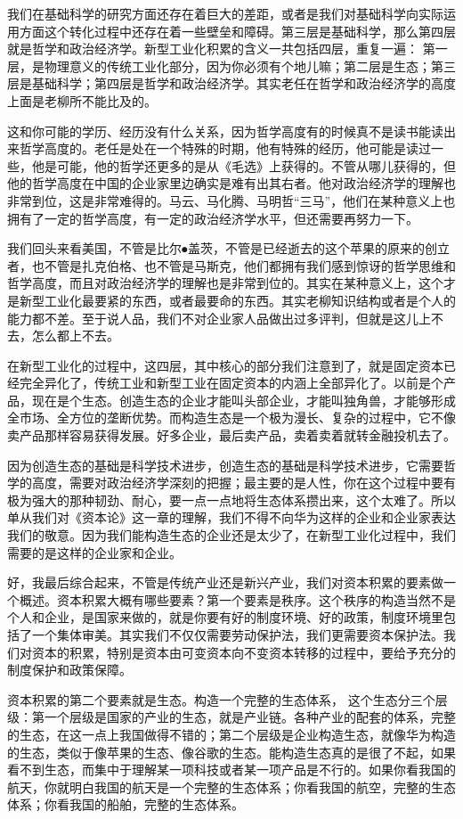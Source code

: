 \documentclass[UTF8, 12pt, a4paper]{ctexrep}
\begin{document}
我们在基础科学的研究方面还存在着巨大的差距，或者是我们对基础科学向实际运用方面这个转化过程中还存在着一些壁垒和障碍。第三层是基础科学，那么第四层就是哲学和政治经济学。新型工业化积累的含义一共包括四层，重复一遍： 第一层，是物理意义的传统工业化部分，因为你必须有个地儿嘛；第二层是生态；第三层是基础科学；第四层是哲学和政治经济学。其实老任在哲学和政治经济学的高度上面是老柳所不能比及的。

这和你可能的学历、经历没有什么关系，因为哲学高度有的时候真不是读书能读出来哲学高度的。老任是处在一个特殊的时期，他有特殊的经历，他可能是读过一些，他是可能，他的哲学还更多的是从《毛选》上获得的。不管从哪儿获得的，但他的哲学高度在中国的企业家里边确实是难有出其右者。他对政治经济学的理解也非常到位，这是非常难得的。马云、马化腾、马明哲“三马”，他们在某种意义上也拥有了一定的哲学高度，有一定的政治经济学水平，但还需要再努力一下。

我们回头来看美国，不管是比尔⦁盖茨，不管是已经逝去的这个苹果的原来的创立者，也不管是扎克伯格、也不管是马斯克，他们都拥有我们感到惊讶的哲学思维和哲学高度，而且对政治经济学的理解也是非常到位的。其实在某种意义上，这个才是新型工业化最要紧的东西，或者最要命的东西。其实老柳知识结构或者是个人的能力都不差。至于说人品，我们不对企业家人品做出过多评判，但就是这儿上不去，怎么都上不去。

在新型工业化的过程中，这四层，其中核心的部分我们注意到了，就是固定资本已经完全异化了，传统工业和新型工业在固定资本的内涵上全部异化了。以前是个产品，现在是个生态。创造生态的企业才能叫头部企业，才能叫独角兽，才能够形成全市场、全方位的垄断优势。而构造生态是一个极为漫长、复杂的过程中，它不像卖产品那样容易获得发展。好多企业，最后卖产品，卖着卖着就转金融投机去了。

因为创造生态的基础是科学技术进步，创造生态的基础是科学技术进步，它需要哲学的高度，需要对政治经济学深刻的把握；最主要的是人性，你在这个过程中要有极为强大的那种韧劲、耐心，要一点一点地将生态体系攒出来，这个太难了。所以单从我们对《资本论》这一章的理解，我们不得不向华为这样的企业和企业家表达我们的敬意。因为我们能构造生态的企业还是太少了，在新型工业化过程中，我们需要的是这样的企业家和企业。

好，我最后综合起来，不管是传统产业还是新兴产业，我们对资本积累的要素做一个概述。资本积累大概有哪些要素？第一个要素是秩序。这个秩序的构造当然不是个人和企业，是国家来做的，就是你要有好的制度环境、好的政策，制度环境里包括了一个集体审美。其实我们不仅仅需要劳动保护法，我们更需要资本保护法。我们对资本的积累，特别是资本由可变资本向不变资本转移的过程中，要给予充分的制度保护和政策保障。

资本积累的第二个要素就是生态。构造一个完整的生态体系， 这个生态分三个层级：第一个层级是国家的产业的生态，就是产业链。各种产业的配套的体系，完整的生态，在这一点上我国做得不错的；第二个层级是企业构造生态，就像华为构造的生态，类似于像苹果的生态、像谷歌的生态。能构造生态真的是很了不起，如果看不到生态，而集中于理解某一项科技或者某一项产品是不行的。如果你看我国的航天，你就明白我国的航天是一个完整的生态体系；你看我国的航空，完整的生态体系；你看我国的船舶，完整的生态体系。
\end{document}
